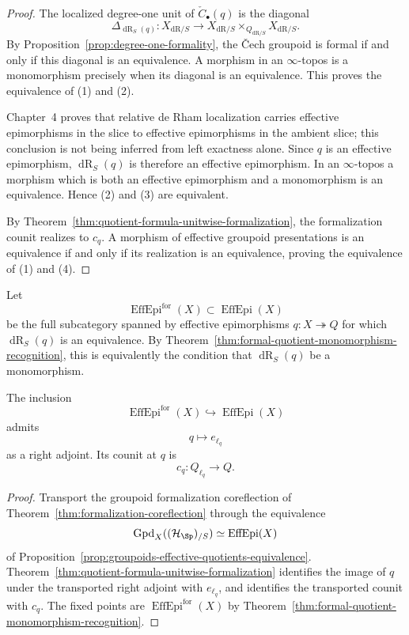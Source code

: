 \begin{proof}
The localized degree-one unit of $\check C_\bullet(q)$ is the diagonal
\[
    \Delta_{\operatorname{dR}_S(q)}:
    X_{\mathrm{dR}/S}
    \longrightarrow
    X_{\mathrm{dR}/S}
    \times_{Q_{\mathrm{dR}/S}}
    X_{\mathrm{dR}/S}.
\]
By Proposition~\ref{prop:degree-one-formality}, the \v{C}ech groupoid is formal
if and only if this diagonal is an equivalence.  A morphism in an
$\infty$-topos is a monomorphism precisely when its diagonal is an
equivalence.  This proves the equivalence of (1) and (2).

Chapter~4 proves that relative de Rham
localization carries effective epimorphisms in the slice to effective
epimorphisms in the ambient slice; this conclusion is not being inferred from
left exactness alone.  Since $q$ is an effective epimorphism,
$\operatorname{dR}_S(q)$ is therefore an effective epimorphism.  In an
$\infty$-topos a morphism which is both an effective epimorphism and a
monomorphism is an equivalence.  Hence (2) and (3) are equivalent.

By Theorem~\ref{thm:quotient-formula-unitwise-formalization}, the formalization
counit realizes to $c_q$.  A morphism of effective groupoid presentations is
an equivalence if and only if its realization is an equivalence, proving the
equivalence of (1) and (4).
\end{proof}

\begin{definition}
\label{def:formal-effective-quotients}
Let
\[
    \operatorname{EffEpi}^{\mathrm{for}}(X)
    \subset
    \operatorname{EffEpi}(X)
\]
be the full subcategory spanned by effective epimorphisms
$q:X\twoheadrightarrow Q$ for which
$\operatorname{dR}_S(q)$ is an equivalence.  By
Theorem~\ref{thm:formal-quotient-monomorphism-recognition}, this is
equivalently the condition that $\operatorname{dR}_S(q)$ be a monomorphism.
\end{definition}

\begin{theorem}
\label{thm:quotient-formalization-coreflection}
The inclusion
\[
    \operatorname{EffEpi}^{\mathrm{for}}(X)
    \hookrightarrow
    \operatorname{EffEpi}(X)
\]
admits
\[
    q\longmapsto e_{\ell_q}
\]
as a right adjoint.  Its counit at $q$ is
\[
    c_q:Q_{\ell_q}\to Q.
\]
\end{theorem}

\begin{proof}
Transport the groupoid formalization coreflection
of Theorem~\ref{thm:formalization-coreflection} through the equivalence
\[
    \operatorname{Gpd}_X((\mathcal H_{\Sp})_{/S})
    \simeq
    \operatorname{EffEpi}(X)
\]
of Proposition~\ref{prop:groupoids-effective-quotients-equivalence}.
Theorem~\ref{thm:quotient-formula-unitwise-formalization} identifies the image
of $q$ under the transported right adjoint with $e_{\ell_q}$, and identifies
the transported counit with $c_q$.  The fixed points are
$\operatorname{EffEpi}^{\mathrm{for}}(X)$ by
Theorem~\ref{thm:formal-quotient-monomorphism-recognition}.
\end{proof}

